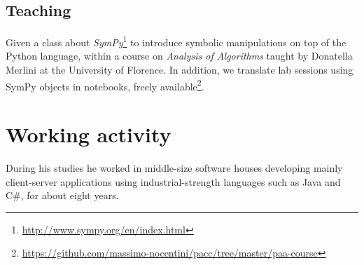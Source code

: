 \documentclass[a4paper]{tufte-handout}
\begin{document}
    \subsection{Teaching}

    Given a class about \emph{SymPy}\footnote{\url{http://www.sympy.org/en/index.html}} to introduce
    symbolic manipulations on top of the Python language, within a course on \emph{Analysis of Algorithms}
    taught by Donatella Merlini at the University of Florence. In addition, we translate lab sessions using
    SymPy objects in notebooks, freely available\footnote{\url{https://github.com/massimo-nocentini/pacc/tree/master/paa-course}}.

    \section{Working activity}

    During his studies he worked in middle-size software houses developing mainly client-server
    applications using industrial-strength languages such as Java and C\#, for about eight years.
        
    
\end{document}
